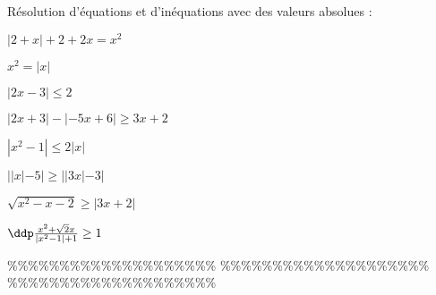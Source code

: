 



\begin{exercice} 
R\'esolution d'\'equations et d'in\'equations avec des valeurs absolues :
\begin{enumerate}
\noindent \begin{minipage}[t]{0.45\textwidth}
\item $|2+x|+2+2x=x^2$
\item $x^2=|x|$
\item $|2x-3|\leq 2$
\item $|2x+3|-|-5x+6|\geq 3x+2$
\end{minipage}
\begin{minipage}[t]{0.45\textwidth}
\item $|x^2-1|\leq 2|x|$
\item $||x| -5|\geq ||3x|-3|$
\item $\sqrt{x^2-x-2}\geq |3x+2|$
\item $\ddp\frac{ x^2+\sqrt{2}x }{|x^2-1|+1}\geq 1$
\end{minipage}
\end{enumerate}
\end{exercice}


\%\%\%\%\%\%\%\%\%\%\%\%\%\%\%\%\%\%\%\%
\%\%\%\%\%\%\%\%\%\%\%\%\%\%\%\%\%\%\%\%
\%\%\%\%\%\%\%\%\%\%\%\%\%\%\%\%\%\%\%\%




